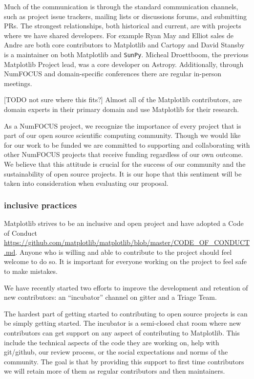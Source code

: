 \documentclass[12pt]{article}
\numberwithin{page}{section}
\begin{document}
Much of the communication is through the standard communication
channels, such as project issue trackers, mailing lists or discussions
forums, and submitting PRs.  The strongest relationships, both
historical and current, are with projects where we have shared
developers.  For example Ryan May and Elliot sales de Andre are both
core contributors to Matplotlib and Cartopy and David Stansby is a
maintainer on both Matplotlib and \texttt{SunPy}.  Micheal Droettboom,
the previous Matplotlib Project lead, was a core developer on Astropy.
Additionally, through NumFOCUS and domain-specific conferences there
are regular in-person meetings.

[TODO not sure where this fits?] Almost all of the Matplotlib
contributors, are domain experts in their primary domain and use
Matplotlib for their research.


As a NumFOCUS project, we recognize the importance of every project
that is part of our open source scientific computing community. Though
we would like for our work to be funded we are committed to supporting
and collaborating with other NumFOCUS projects that receive funding
regardless of our own outcome. We believe that this attitude is
crucial for the success of our community and the sustainability of
open source projects. It is our hope that this sentiment will be taken
into consideration when evaluating our proposal.


\subsubsection{inclusive practices}

Matplotlib strives to be an inclusive and open project and have
adopted a Code of Conduct
\url{https://github.com/matplotlib/matplotlib/blob/master/CODE_OF_CONDUCT.md}.
Anyone who is willing and able to contribute to the project should feel
welcome to do so.  It is important for everyone working on the project
to feel safe to make mistakes.

We have recently started two efforts to improve the development and
retention of new contributors: an ``incubator'' channel on gitter and
a Triage Team.

The hardest part of getting started to contributing to open source
projects is can be simply getting started.  The incubator is a
semi-closed chat room where new contributors can get support on any
aspect of contributing to Matplotlib.  This include the technical
aspects of the code they are working on, help with git/github, our
review process, or the social expectations and norms of the community.  The
goal is that by providing this support to first time contributors we will
retain more of them as regular contributors and then maintainers.
\end{document}
